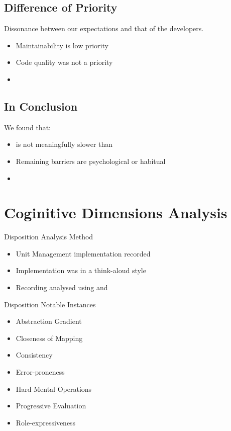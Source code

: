\subsection{Difference of Priority}
\begin{frame}{\secname}{\subsecname}
	Dissonance between our expectations and that of the developers.
	\begin{itemize}
		\item<2-> Maintainability is low priority
		\item<3-> Code quality was not a priority
		\item<4-> 
	\end{itemize}
\end{frame}

\subsection{In Conclusion}
\begin{frame}{\secname}{\subsecname}
	We found that:
	\begin{itemize}
		\item<2-> \fs is not meaningfully slower than \cs
		\item<3-> Remaining barriers are psychological or habitual
		\item<4-> 
	\end{itemize}
\end{frame}

\section{Coginitive Dimensions Analysis}
\begin{frame}{\secname}{Disposition}
	Analysis Method
	\begin{itemize}
		\item Unit Management implementation recorded
		\item Implementation was in a think-aloud style
		\item Recording analysed using \cognitive and \attention
	\end{itemize}
\end{frame}

\begin{frame}{\secname}{Disposition}
	Notable Instances
	\begin{itemize}
		\item Abstraction Gradient
		\item Closeness of Mapping
		\item Consistency
		\item Error-proneness
		\item Hard Mental Operations
		\item Progressive Evaluation
		\item Role-expressiveness
	\end{itemize}
\end{frame}

